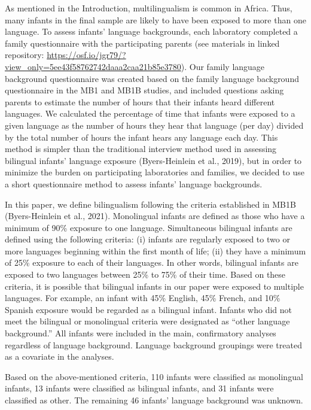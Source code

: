\documentclass[
  english,
  ,man,floatsintext]{apa6}
\begin{document}
As mentioned in the Introduction, multilingualism is common in Africa. Thus, many infants in the final sample are likely to have been exposed to more than one language. To assess infants' language backgrounds, each laboratory completed a family questionnaire with the participating parents (see materials in linked repository: \url{https://osf.io/jgr79/?view_only=5ee43f58762742daaa2caa21b85e3780}). Our family language background questionnaire was created based on the family language background questionnaire in the MB1 and MB1B studies, and included questions asking parents to estimate the number of hours that their infants heard different languages. We calculated the percentage of time that infants were exposed to a given language as the number of hours they hear that language (per day) divided by the total number of hours the infant hears any language each day. This method is simpler than the traditional interview method used in assessing bilingual infants' language exposure (Byers-Heinlein et al., 2019), but in order to minimize the burden on participating laboratories and families, we decided to use a short questionnaire method to assess infants' language backgrounds.

In this paper, we define bilingualism following the criteria established in MB1B (Byers-Heinlein et al., 2021). Monolingual infants are defined as those who have a minimum of 90\% exposure to one language. Simultaneous bilingual infants are defined using the following criteria: (i) infants are regularly exposed to two or more languages beginning within the first month of life; (ii) they have a minimum of 25\% exposure to each of their languages. In other words, bilingual infants are exposed to two languages between 25\% to 75\% of their time. Based on these criteria, it is possible that bilingual infants in our paper were exposed to multiple languages. For example, an infant with 45\% English, 45\% French, and 10\% Spanish exposure would be regarded as a bilingual infant. Infants who did not meet the bilingual or monolingual criteria were designated as ``other language background.'' All infants were included in the main, confirmatory analyses regardless of language background. Language background groupings were treated as a covariate in the analyses.

Based on the above-mentioned criteria, 110 infants were classified as monolingual infants, 13 infants were classified as bilingual infants, and 31 infants were classified as other. The remaining 46 infants' language background was unknown.
\end{document}
